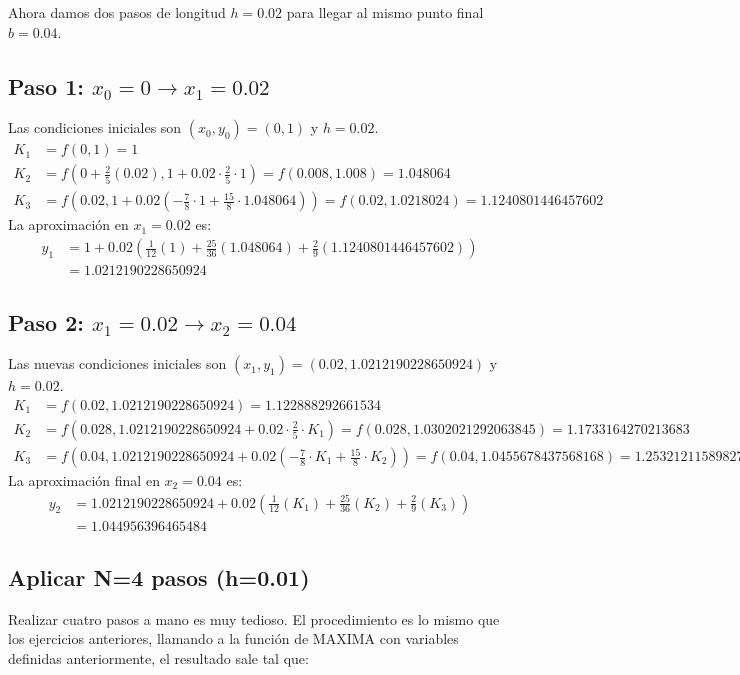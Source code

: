\documentclass{article}
\begin{document}
Ahora damos dos pasos de longitud \(h=0.02\) para llegar al mismo punto final \(b=0.04\).

\subsection*{Paso 1: \(x_0 = 0 \to x_1 = 0.02\)}
Las condiciones iniciales son \((x_0, y_0) = (0, 1)\) y \(h=0.02\).
\begin{align*}
    K_1 &= f(0, 1) = \boxed{1} \\
    K_2 &= f(0 + \frac{2}{5}(0.02), 1 + 0.02 \cdot \frac{2}{5} \cdot 1) = f(0.008, 1.008) = \boxed{1.048064} \\
    K_3 &= f(0.02, 1 + 0.02(-\frac{7}{8} \cdot 1 + \frac{15}{8} \cdot 1.048064)) = f(0.02, 1.0218024) = \boxed{1.1240801446457602}
\end{align*}
La aproximación en \(x_1=0.02\) es:
\begin{align*}
    y_1 &= 1 + 0.02 \left( \frac{1}{12}(1) + \frac{25}{36}(1.048064) + \frac{2}{9}(1.1240801446457602) \right) \\
        &= \boxed{1.0212190228650924}
\end{align*}

\subsection*{Paso 2: \(x_1 = 0.02 \to x_2 = 0.04\)}

Las nuevas condiciones iniciales son \((x_1, y_1) = (0.02, 1.0212190228650924)\) y \(h=0.02\).
\begin{align*}
    K_1 &= f(0.02, 1.0212190228650924) = \boxed{1.122888292661534} \\
    K_2 &= f(0.028, 1.0212190228650924 + 0.02 \cdot \frac{2}{5} \cdot K_1) = f(0.028, 1.0302021292063845) = \boxed{1.1733164270213683} \\
    K_3 &= f(0.04, 1.0212190228650924 + 0.02(-\frac{7}{8} \cdot K_1 + \frac{15}{8} \cdot K_2)) = f(0.04, 1.0455678437568168) = \boxed{1.2532121158982792}
\end{align*}
La aproximación final en \(x_2=0.04\) es:
\begin{align*}
    y_2 &= 1.0212190228650924 + 0.02 \left( \frac{1}{12}(K_1) + \frac{25}{36}(K_2) + \frac{2}{9}(K_3) \right) \\
        &= \boxed{1.044956396465484}
\end{align*}


\subsection{Aplicar N=4 pasos (h=0.01)}
Realizar cuatro pasos a mano es muy tedioso. El procedimiento es lo mismo que los ejercicios anteriores, llamando a la función de MAXIMA con variables definidas anteriormente, el resultado sale tal que:
\end{document}
